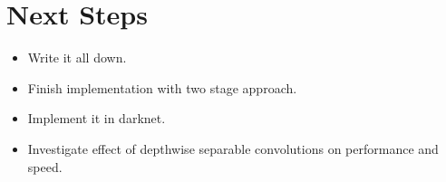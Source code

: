 \documentclass{article}
\begin{document}
\section{Next Steps}
\begin{itemize}
	\item Write it all down.
	\item Finish implementation with two stage approach.
	\item Implement it in darknet.
	\item Investigate effect of depthwise separable convolutions on performance and speed.
	
\end{itemize}
\end{document}
